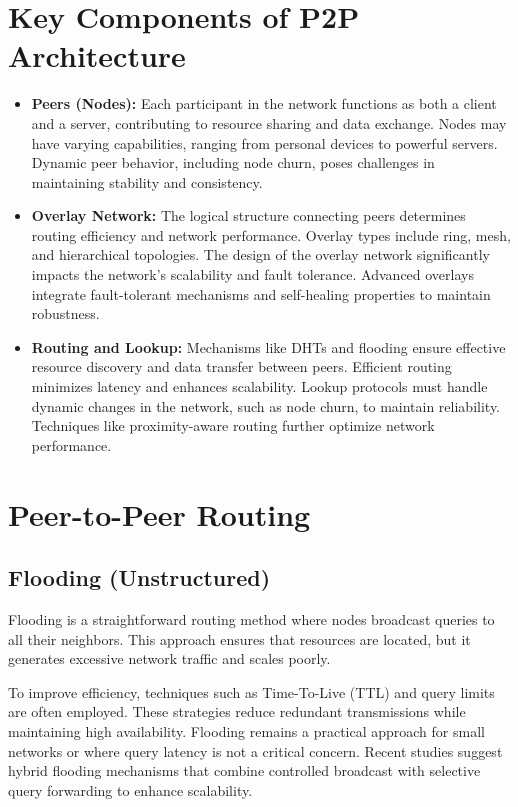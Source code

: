 \documentclass[12pt]{article}
\begin{document}
\section{Key Components of P2P Architecture}
\begin{itemize}
    \item \textbf{Peers (Nodes):} Each participant in the network functions as both a client and a server, contributing to resource sharing and data exchange. Nodes may have varying capabilities, ranging from personal devices to powerful servers. Dynamic peer behavior, including node churn, poses challenges in maintaining stability and consistency.
    \item \textbf{Overlay Network:} The logical structure connecting peers determines routing efficiency and network performance. Overlay types include ring, mesh, and hierarchical topologies. The design of the overlay network significantly impacts the network's scalability and fault tolerance. Advanced overlays integrate fault-tolerant mechanisms and self-healing properties to maintain robustness.
    \item \textbf{Routing and Lookup:} Mechanisms like DHTs and flooding ensure effective resource discovery and data transfer between peers. Efficient routing minimizes latency and enhances scalability. Lookup protocols must handle dynamic changes in the network, such as node churn, to maintain reliability. Techniques like proximity-aware routing further optimize network performance.
\end{itemize}

\section{Peer-to-Peer Routing}

\subsection{Flooding (Unstructured)}
Flooding is a straightforward routing method where nodes broadcast queries to all their neighbors. This approach ensures that resources are located, but it generates excessive network traffic and scales poorly.

To improve efficiency, techniques such as Time-To-Live (TTL) and query limits are often employed. These strategies reduce redundant transmissions while maintaining high availability. Flooding remains a practical approach for small networks or where query latency is not a critical concern. Recent studies suggest hybrid flooding mechanisms that combine controlled broadcast with selective query forwarding to enhance scalability.
\end{document}

